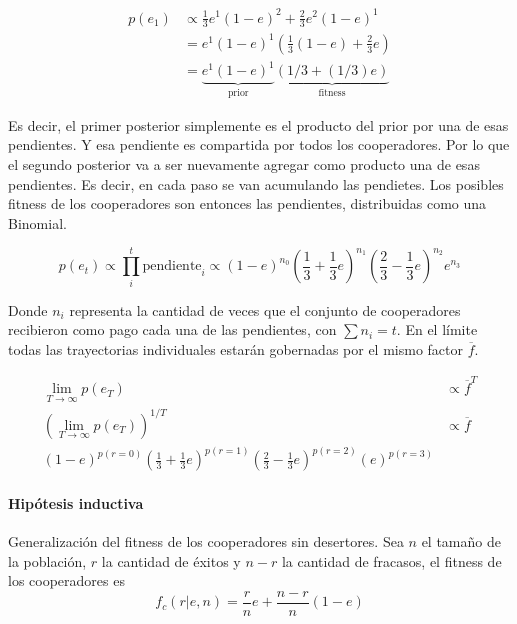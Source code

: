 \documentclass[a4paper,10pt]{article}
\begin{document}
\begin{equation}
\begin{split}
p(e_1) & \propto \frac{1}{3} e^1 (1-e)^2 + \frac{2}{3} e^2 (1-e)^1  \\
& =  e^1 (1-e)^1 ( \frac{1}{3} (1-e) +  \frac{2}{3} e)  \\
& =  \underbrace{e^1 (1-e)^1}_{\text{prior}} \underbrace{(1/3 + (1/3)e )}_{\text{fitness}}
\end{split}
\end{equation}

Es decir, el primer posterior simplemente es el producto del prior por una de esas pendientes.
Y esa pendiente es compartida por todos los cooperadores.
Por lo que el segundo posterior va a ser nuevamente agregar como producto una de esas pendientes.
Es decir, en cada paso se van acumulando las pendietes.
Los posibles fitness de los cooperadores son entonces las pendientes, distribuidas como una Binomial. 


\begin{equation}
p(e_t) \propto \prod_i^t \text{pendiente}_i \propto (1-e)^{n_0} (\frac{1}{3} + \frac{1}{3}e )^{n_1} (\frac{2}{3} - \frac{1}{3}e )^{n_2} e^{n_3}
\end{equation}

Donde $n_i$ representa la cantidad de veces que el conjunto de cooperadores recibieron como pago cada una de las pendientes, con $\sum n_i = t$.
En el límite todas las trayectorias individuales estarán gobernadas por el mismo factor $\overline{f}$.

\begin{equation}
\begin{split}
\lim_{T \rightarrow \infty} p(e_T) & \propto \overline{f}^T \\
(\lim_{T \rightarrow \infty} p(e_T) )^{1/T} & \propto \overline{f} \\
(1-e)^{p(r=0)} (\frac{1}{3} + \frac{1}{3}e )^{p(r=1)} (\frac{2}{3} - \frac{1}{3}e )^{p(r=2)} (e)^{p(r=3)} & 
\end{split}
\end{equation}


\vspace{0.3cm}

\paragraph{Hipótesis inductiva} Generalización del fitness de los cooperadores sin desertores.
Sea $n$ el tamaño de la población, $r$ la cantidad de éxitos y $n-r$ la cantidad de fracasos, el fitness de los cooperadores es
\begin{equation}
f_c(r|e,n) = \frac{r}{n} e + \frac{n-r}{n}(1-e)
\end{equation}
\end{document}
